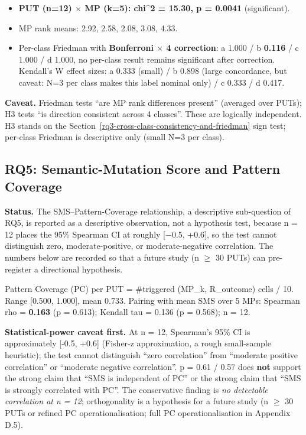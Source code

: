 \documentclass[12pt]{article}
\providecommand{\tightlist}{\setlength{\itemsep}{0pt}\setlength{\parskip}{0pt}}
\begin{document}
\begin{itemize}
\tightlist
\item
  \textbf{PUT (n=12) $\times$ MP (k=5): chi\^{}2 = 15.30, p = 0.0041}
  (significant).
\item
  MP rank means: 2.92, 2.58, 2.08, 3.08, 4.33.
\item
  Per-class Friedman with \textbf{Bonferroni $\times$ 4 correction}: a
  1.000 / b \textbf{0.116} / c 1.000 / d 1.000, no per-class
  result remains significant after correction. Kendall's W effect sizes:
  a 0.333 (small) / b 0.898 (large concordance, but caveat: N=3 per
  class makes this label nominal only) / c 0.333 / d 0.417.
\end{itemize}

\textbf{Caveat.} Friedman tests ``are MP rank differences present''
(averaged over PUTs); H3 tests ``is direction consistent across 4
classes''. These are logically independent. H3 stands on the Section~\ref{rq3-cross-class-consistency-and-friedman} sign
test; per-class Friedman is descriptive only (small N=3 per class).

\subsection{RQ5: Semantic-Mutation Score and Pattern Coverage}\label{rq4-sms-vs-pattern-coverage}

\textbf{Status.} The SMS--Pattern-Coverage relationship, a descriptive
sub-question of RQ5, is reported as a descriptive observation, not a
hypothesis test, because n = 12 places the 95\% Spearman CI at roughly
{[}−0.5, +0.6{]}, so the test cannot distinguish zero,
moderate-positive, or moderate-negative correlation. The numbers below
are recorded so that a future study (n $\geq$ 30 PUTs) can pre-register a directional
hypothesis.

Pattern Coverage (PC) per PUT = \#triggered (MP\_k, R\_outcome) cells /
10. Range {[}0.500, 1.000{]}, mean 0.733. Pairing with mean SMS over 5
MPs: Spearman rho = \textbf{0.163} (p = 0.613); Kendall tau = 0.136 (p =
0.568); n = 12.

\textbf{Statistical-power caveat first.} At n = 12, Spearman's 95\% CI
is approximately {[}-0.5, +0.6{]} (Fisher-z approximation, a rough
small-sample heuristic); the test cannot distinguish ``zero
correlation'' from ``moderate positive correlation'' or ``moderate
negative correlation''. p = 0.61 / 0.57 does \textbf{not} support the
strong claim that ``SMS is independent of PC'' or the strong claim that
``SMS is strongly correlated with PC''. The conservative finding is
\emph{no detectable correlation at n = 12}; orthogonality is a
hypothesis for a future study (n $\geq$ 30 PUTs or refined PC operationalisation; full PC
operationalisation in Appendix D.5).
\end{document}
